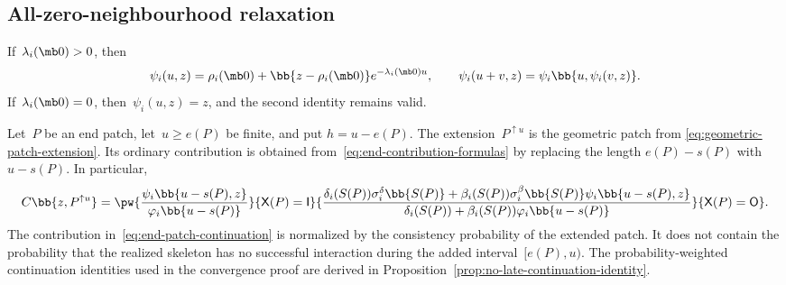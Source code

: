\subsection{All-zero-neighbourhood relaxation}
\label{app:positivity-algebra}

If~$\lambda_i(\mb 0)>0$, then
\begin{equation}
\label{eq:all-zero-neighbourhood-relaxation}
\psi_i(u,z)
=
\rho_i(\mb 0)
+
\bb{z-\rho_i(\mb 0)}e^{-\lambda_i(\mb 0)u},
\qquad
\psi_i(u+v,z)
=
\psi_i\bb{u,\psi_i(v,z)}.
\end{equation}
If~$\lambda_i(\mb 0)=0$, then~$\psi_i(u,z)=z$, and the second identity remains
valid.

Let~$P$ be an end patch, let~$u\geq e(P)$ be finite, and put
$h=u-e(P)$. The extension~$P^{\uparrow u}$ is the geometric patch from
\eqref{eq:geometric-patch-extension}. Its ordinary contribution is obtained
from~\eqref{eq:end-contribution-formulas} by replacing the length
$e(P)-s(P)$ with~$u-s(P)$. In particular,
\begin{equation}
\label{eq:end-patch-continuation}
C\bb{z,P^{\uparrow u}}
=
\pw{
\displaystyle
\frac{\psi_i\bb{u-s(P),z}}{\varphi_i\bb{u-s(P)}}
}{\mathsf X(P)=\mathsf I}
{
\displaystyle
\frac{
\delta_i(S(P))\sigma_i^\delta\bb{S(P)}
+
\beta_i(S(P))\sigma_i^\beta\bb{S(P)}
\psi_i\bb{u-s(P),z}
}{
\delta_i(S(P))+\beta_i(S(P))\varphi_i\bb{u-s(P)}
}
}{\mathsf X(P)=\mathsf O}.
\end{equation}
The contribution in~\eqref{eq:end-patch-continuation} is normalized by the
consistency probability of the extended patch. It does not contain the
probability that the realized skeleton has no successful interaction during
the added interval~$[e(P),u)$. The probability-weighted continuation identities
used in the convergence proof are derived in
Proposition~\ref{prop:no-late-continuation-identity}.
